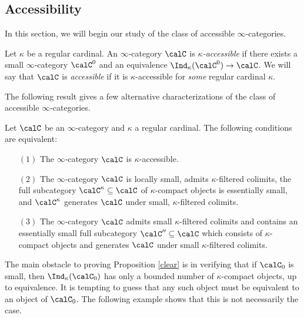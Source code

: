 \subsection{Accessibility}\label{accessible}

In this section, we will begin our study of the class of accessible $\infty$-categories.

\begin{definition}\label{kapacc}
Let $\kappa$ be a regular cardinal.
An $\infty$-category $\calC$ is {\it $\kappa$-accessible} if there exists a small
$\infty$-category $\calC^{0}$ and an equivalence $\Ind_{\kappa}(\calC^{0}) \rightarrow \calC$.
We will say that $\calC$ is {\it accessible} if it is $\kappa$-accessible for {\em some} regular cardinal $\kappa$.
\end{definition}

The following result gives a few alternative characterizations of the class of accessible $\infty$-categories.

\begin{proposition}\label{clear}
Let $\calC$ be an $\infty$-category and $\kappa$ a regular cardinal. The
following conditions are equivalent:

\begin{itemize}
\item[$(1)$] The $\infty$-category $\calC$ is $\kappa$-accessible.

\item[$(2)$] The $\infty$-category $\calC$ is locally small, admits $\kappa$-filtered colimits, the
full subcategory $\calC^{\kappa} \subseteq \calC$ of $\kappa$-compact objects is essentially small,  and $\calC^{\kappa}$ generates $\calC$ under small, $\kappa$-filtered colimits.

\item[$(3)$] The $\infty$-category $\calC$ admits small $\kappa$-filtered colimits and contains an essentially small full subcategory $\calC'' \subseteq \calC$ which consists of $\kappa$-compact objects and generates $\calC$ under small $\kappa$-filtered colimits.
\end{itemize}
\end{proposition}

The main obstacle to proving Proposition \ref{clear} is in
verifying that if $\calC_0$ is small, then $\Ind_\kappa(\calC_0)$
has only a bounded number of $\kappa$-compact objects, up to equivalence. It
is tempting to guess that any such object must be equivalent to an
object of $\calC_0$. The following example shows that this is not
necessarily the case.

